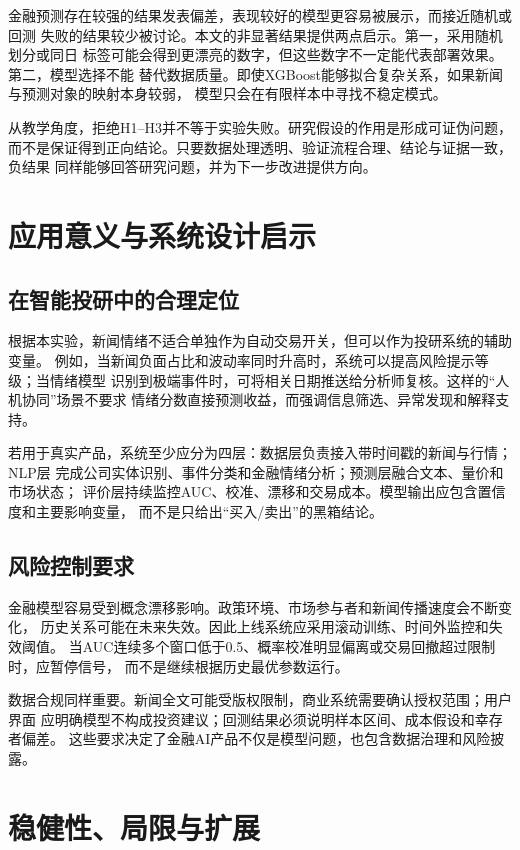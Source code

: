 \documentclass[UTF8,a4paper,10pt,twocolumn,fontset=none]{ctexart}
\begin{document}
金融预测存在较强的结果发表偏差，表现较好的模型更容易被展示，而接近随机或回测
失败的结果较少被讨论。本文的非显著结果提供两点启示。第一，采用随机划分或同日
标签可能会得到更漂亮的数字，但这些数字不一定能代表部署效果。第二，模型选择不能
替代数据质量。即使XGBoost能够拟合复杂关系，如果新闻与预测对象的映射本身较弱，
模型只会在有限样本中寻找不稳定模式。

从教学角度，拒绝H1--H3并不等于实验失败。研究假设的作用是形成可证伪问题，
而不是保证得到正向结论。只要数据处理透明、验证流程合理、结论与证据一致，负结果
同样能够回答研究问题，并为下一步改进提供方向。

\section{应用意义与系统设计启示}

\subsection{在智能投研中的合理定位}

根据本实验，新闻情绪不适合单独作为自动交易开关，但可以作为投研系统的辅助变量。
例如，当新闻负面占比和波动率同时升高时，系统可以提高风险提示等级；当情绪模型
识别到极端事件时，可将相关日期推送给分析师复核。这样的“人机协同”场景不要求
情绪分数直接预测收益，而强调信息筛选、异常发现和解释支持。

若用于真实产品，系统至少应分为四层：数据层负责接入带时间戳的新闻与行情；NLP层
完成公司实体识别、事件分类和金融情绪分析；预测层融合文本、量价和市场状态；
评价层持续监控AUC、校准、漂移和交易成本。模型输出应包含置信度和主要影响变量，
而不是只给出“买入/卖出”的黑箱结论。

\subsection{风险控制要求}

金融模型容易受到概念漂移影响。政策环境、市场参与者和新闻传播速度会不断变化，
历史关系可能在未来失效。因此上线系统应采用滚动训练、时间外监控和失效阈值。
当AUC连续多个窗口低于0.5、概率校准明显偏离或交易回撤超过限制时，应暂停信号，
而不是继续根据历史最优参数运行。

数据合规同样重要。新闻全文可能受版权限制，商业系统需要确认授权范围；用户界面
应明确模型不构成投资建议；回测结果必须说明样本区间、成本假设和幸存者偏差。
这些要求决定了金融AI产品不仅是模型问题，也包含数据治理和风险披露。

\section{稳健性、局限与扩展}
\end{document}
